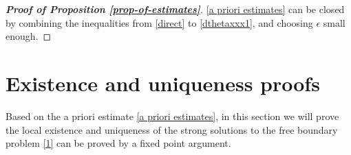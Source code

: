 \documentclass[12pt,a4paper]{amsart}
\numberwithin{equation}{section}
\theoremstyle{plain}
\theoremstyle{definition}
\newcommand{\bpartial}{\bar{\partial}}
\begin{document}
\begin{proof}[\textbf{Proof of Proposition \ref{prop-of-estimates}}]
	\eqref{a priori estimates} can be closed by combining the inequalities from \eqref{direct} to \eqref{dthetaxxx1}, and choosing $\epsilon$ small enough. 
	

\iffalse	
	The following is one of orders to proved the terms in $F(t)$ bounded by \eqref{a priori estimates}.
	\begin{align*}
	&\qquad
	\overset{\eqref{vtx}+\eqref{thetatx}}{\Longrightarrow}
	\int_{0}^{t} \|\bpartial v_t\|_{H^1}^2 +\|\bpartial\Theta_t\|_{H_0^1}^2 \ dt'
	\overset{\eqref{dvtx}+\eqref{dthetatx}}{\Longrightarrow}
	\int_{0}^{t} \| v_t\|_{H^2}^2 +\|\Theta_t\|_{H^2}^2 \ dt'\\
	&
	\overset{\eqref{vtt}+\eqref{thetatt}}{\Longrightarrow}
	\|\rho_0^{1/2}v_{tt}(\cdot,t)\|_{L^2}^2+\|\rho_0^{1/2}\Theta_{tt}(\cdot,t)\|_{L^2}^2
	+\int_{0}^{t} \| v_{tt}\|_{H^1}^2 +\|\Theta_{tt}\|_{H_0^1}^2 \ dt'\\
	&
	\overset{\eqref{vtxx}+\eqref{thetatxx}}{\Longrightarrow}
	\int_{0}^{t} \| \bpartial^2 v_t\|_{H^1}^2 +\|\bpartial^2\Theta_t\|_{H_0^1}^2 \ dt'
	\overset{\eqref{dvtxx1}+\eqref{dvtxx2}+\eqref{dthetatxx1}+\eqref{dthetatxx2}}{\Longrightarrow}
	\int_{0}^{t} \|  v_t\|_{H^3}^2 +\|\Theta_t\|_{H^3}^2 \ dt'\\
	&
	\overset{\eqref{vxxx}+\eqref{thetaxxx}}{\Longrightarrow}
	\int_{0}^{t} \| \bpartial^3 v\|_{H^1}^2 +\|\bpartial^3\Theta\|_{H_0^1}^2 \ dt'
	\overset{\eqref{dvxxx1}+\eqref{dvxxx2}+\eqref{dthetaxxx1}+\eqref{dthetaxxx2}}{\Longrightarrow}
	\int_{0}^{t} \| \bpartial v\|_{H^3}^2 +\|\bpartial\Theta\|_{H^3}^2 \ dt'
	\end{align*}
\fi
\end{proof}







\vspace{0.7cm}
\section{Existence and uniqueness proofs}
Based on the a priori estimate \eqref{a priori estimates}, in this section we will prove the local existence and uniqueness of the strong solutions to the free boundary problem \eqref{1} can be proved by a fixed point argument.
\end{document}
